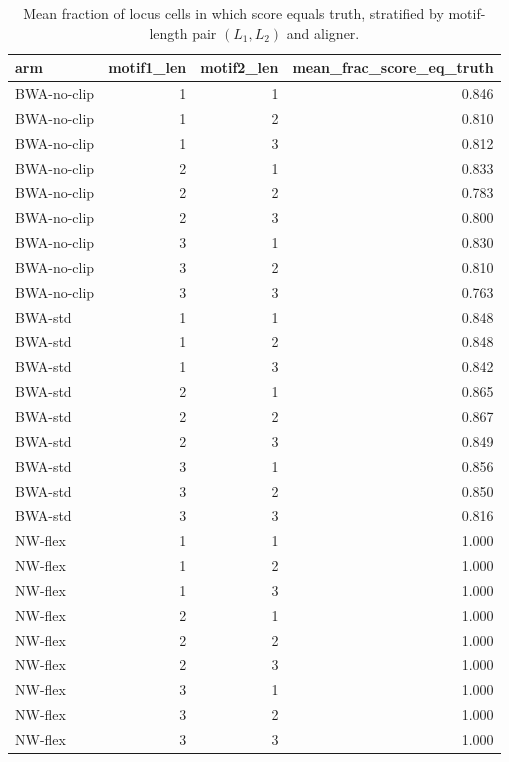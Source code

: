 \begin{table}
\caption{Mean fraction of locus cells in which score equals truth, stratified by motif-length pair $(L_1, L_2)$ and aligner.}
\label{tab:compound-motif-length-breakdown}
\begin{tabular}{lrrr}
\toprule
arm & motif1_len & motif2_len & mean_frac_score_eq_truth \\
\midrule
BWA-no-clip & 1 & 1 & 0.846 \\
BWA-no-clip & 1 & 2 & 0.810 \\
BWA-no-clip & 1 & 3 & 0.812 \\
BWA-no-clip & 2 & 1 & 0.833 \\
BWA-no-clip & 2 & 2 & 0.783 \\
BWA-no-clip & 2 & 3 & 0.800 \\
BWA-no-clip & 3 & 1 & 0.830 \\
BWA-no-clip & 3 & 2 & 0.810 \\
BWA-no-clip & 3 & 3 & 0.763 \\
BWA-std & 1 & 1 & 0.848 \\
BWA-std & 1 & 2 & 0.848 \\
BWA-std & 1 & 3 & 0.842 \\
BWA-std & 2 & 1 & 0.865 \\
BWA-std & 2 & 2 & 0.867 \\
BWA-std & 2 & 3 & 0.849 \\
BWA-std & 3 & 1 & 0.856 \\
BWA-std & 3 & 2 & 0.850 \\
BWA-std & 3 & 3 & 0.816 \\
NW-flex & 1 & 1 & 1.000 \\
NW-flex & 1 & 2 & 1.000 \\
NW-flex & 1 & 3 & 1.000 \\
NW-flex & 2 & 1 & 1.000 \\
NW-flex & 2 & 2 & 1.000 \\
NW-flex & 2 & 3 & 1.000 \\
NW-flex & 3 & 1 & 1.000 \\
NW-flex & 3 & 2 & 1.000 \\
NW-flex & 3 & 3 & 1.000 \\
\bottomrule
\end{tabular}
\end{table}
